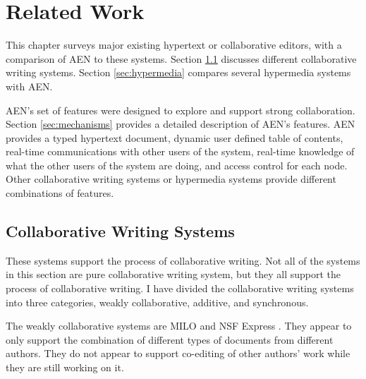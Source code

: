 

\newpage

\chapter{Related Work}
\label{sec:related-work}

This chapter surveys major existing hypertext or collaborative editors,
with a comparison of AEN to these systems.  Section \ref{sec:collab-sys}
discusses different collaborative writing systems.  Section
\ref{sec:hypermedia} compares several hypermedia systems with AEN.

AEN's set of features were designed to explore and support strong
collaboration. Section \ref{sec:mechanisms} provides a detailed description
of AEN's features.  AEN provides a typed hypertext document, dynamic user
defined table of contents, real-time communications with other users of the
system, real-time knowledge of what the other users of the system are doing,
and access control for each node.  Other collaborative writing systems or
hypermedia systems provide different combinations of features.

\section{Collaborative Writing Systems}
\label{sec:collab-sys}

These systems support the process of collaborative writing.  Not all of the
systems in this section are pure collaborative writing system, but they all
support the process of collaborative writing.  I have divided the
collaborative writing systems into three categories, weakly collaborative,
additive, and synchronous.

The weakly collaborative systems are MILO \cite{Jones93} and NSF Express
\cite{Greenberg91}.  They appear to only support the combination of
different types of documents from different authors.  They do not appear to
support co-editing of other authors' work while they are still working on
it.

